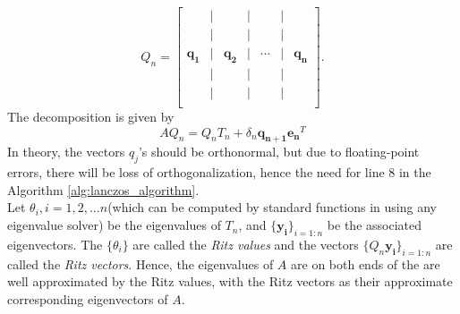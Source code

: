 	\[
	Q_n = 
	\begin{bmatrix}
		 & \big| &  & \big| &  & \big| &  \\
		 & \big| &  & \big| &  & \big| &  \\
		 \mathbf{q_1} & \big| & \mathbf{q_2} & \big| & \cdots & \big| & \mathbf{q_n} \\
		 & \big| &  & \big| &  & \big| &  \\
		 & \big| &  & \big| &  & \big| &  \\
	\end{bmatrix}.
	\]
The decomposition is given by
\begin{equation}\label{eq:Lanczos_Decomposition}
	AQ_n = Q_nT_n + \delta_{n}\mathbf{q_{n+1}}\mathbf{e_n}^T
\end{equation}
In theory, the vectors $q_j$'s should be orthonormal, but due to floating-point errors, there will be loss of orthogonalization, hence the need for line 8 in the Algorithm \ref{alg:lanczos_algorithm}.\\
Let $\theta_i, i = 1,2, \ldots n$(which can be computed by standard functions in using any eigenvalue solver) be the eigenvalues of $T_n$, and $\{\mathbf{y_i}\}_{i = 1 : n}$ be the associated eigenvectors. The $\{\theta_i\}$ are called the \textit{Ritz values} and the vectors $\{Q_n\mathbf{y_i}\}_{i = 1 : n}$ are called the \textit{Ritz vectors}. Hence, the eigenvalues of $A$ are on both ends of the are well approximated by the Ritz values, with the Ritz vectors as their approximate corresponding eigenvectors of $A$.

